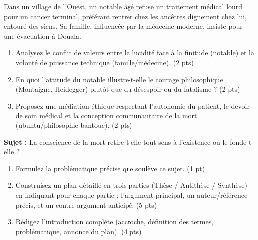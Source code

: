 \documentclass[11pt]{article}
\begin{document}
\begin{exercice}
Dans un village de l'Ouest, un notable âgé refuse un traitement médical lourd pour un cancer terminal, préférant \og rentrer chez les ancêtres \fg{} dignement chez lui, entouré des siens. Sa famille, influencée par la médecine moderne, insiste pour une évacuation à Douala.
\begin{enumerate}
    \item Analysez le conflit de valeurs entre la \og lucidité face à la finitude \fg{} (notable) et la \og volonté de puissance technique \fg{} (famille/médecine). \hfill (2 pts)
    \item En quoi l'attitude du notable illustre-t-elle le \og courage \fg{} philosophique (Montaigne, Heidegger) plutôt que du désespoir ou du fatalisme ? \hfill (2 pts)
    \item Proposez une médiation éthique respectant l'autonomie du patient, le devoir de soin médical et la conception communautaire de la mort (ubuntu/philosophie bantoue). \hfill (2 pts)
\end{enumerate}
\end{exercice}

\begin{exercice}
\textbf{Sujet :} \og La conscience de la mort retire-t-elle tout sens à l'existence ou le fonde-t-elle ? \fg{}
\begin{enumerate}
    \item Formulez la problématique précise que soulève ce sujet. \hfill (1 pt)
    \item Construisez un plan détaillé en trois parties (Thèse / Antithèse / Synthèse) en indiquant pour chaque partie : l'argument principal, un auteur/référence précis, et un contre-argument anticipé. \hfill (5 pts)
    \item Rédigez l'introduction complète (accroche, définition des termes, problématique, annonce du plan). \hfill (4 pts)
\end{enumerate}
\end{exercice}
\end{document}
